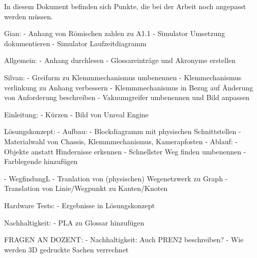 
In diesem Dokument befinden sich Punkte, die bei der Arbeit noch angepasst werden müssen.





Gian:
- Anhang von Römischen zahlen zu A1.1
- Simulator Umsetzung dokumentieren
- Simulator Laufzeitdiagramm

Allgemein:
- Anhang durchlesen
- Glossareinträge und Akronyme erstellen

Silvan:
- Greifarm zu Klemmmechanismus umbenennen
- Klemmechanismus verlinkung zu Anhang verbessern
- Klemmmechanismus in Bezug auf Änderung von Anforderung beschreiben
- Vakuumgreifer umbenennen und Bild anpassen

Einleitung:
- Kürzen
- Bild von Unreal Engine

Lösungskonzept:
- Aufbau:
  - Blockdiagramm mit physischen Schnittstellen
  - Materialwahl von Chassis, Klemmmechanismus, Kamerapfosten
- Ablauf:
  - Objekte anstatt Hindernisse erkennen
  - Schnellster Weg finden umbenennen
  - Farblegende hinzufügen

- WegfindungL
  - Tranlation von (physischen) Wegenetzwerk zu Graph
  - Translation von Linie/Wegpunkt zu Kanten/Knoten

Hardware Tests:
- Ergebnisse in Lösungskonzept

Nachhaltigkeit:
- PLA zu Glossar hinzufügen






FRAGEN AN DOZENT:
- Nachhaltigkeit: Auch PREN2 beschreiben? 
- Wie werden 3D gedruckte Sachen verrechnet